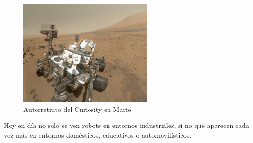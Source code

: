 \begin{figure}[H]
\centering
\includegraphics[width=0.6\textwidth]{img/curiosity.jpg}
\caption{Autorretrato del Curiosity en Marte} \label{fig:curiosity}
\end{figure}

Hoy en día no solo se ven robots en entornos industriales, si no que aparecen cada vez más en entornos domésticos, educativos o automovilísticos.

